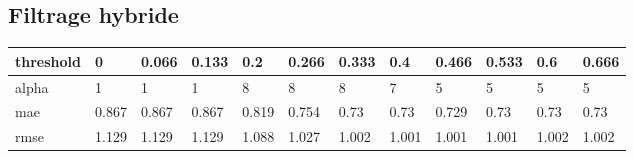 \begin{appendices}
\subsection*{Filtrage hybride}

\begin{center}\label{tab11}
	\begin{tabularx}{\textwidth}{|l|X|X|X|X|X|X|X|X|X|X|X|}\hline
		threshold & 0 & 0.066 & 0.133 & 0.2 & 0.266 & 0.333 & 0.4 & 0.466 & 0.533 & 0.6 & 0.666 \\ \hline
		alpha & 1 & 1 & 1 & 8 & 8 & 8 & 7 & 5 & 5 & 5 & 5 \\ \hline
		mae & 0.867 & 0.867 & 0.867 & 0.819 & 0.754 & 0.73 & 0.73 & 0.729 & 0.73 & 0.73 & 0.73 \\ \hline
		rmse & 1.129 & 1.129 & 1.129 & 1.088 & 1.027 & 1.002 & 1.001 & 1.001 & 1.001 & 1.002 & 1.002 \\ \hline
	\end{tabularx}	
\end{center}


\end{appendices}
